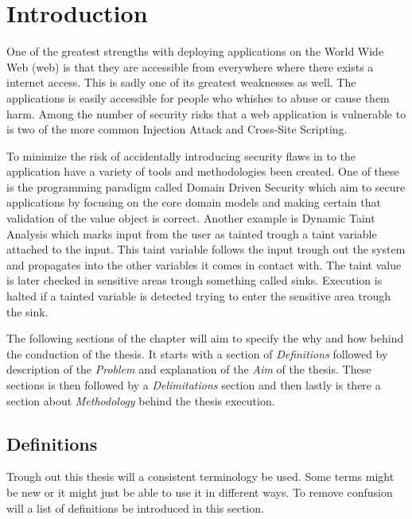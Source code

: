 \chapter{Introduction}
One of the greatest strengths with deploying applications on the World Wide Web (web) is that they are accessible from everywhere where there exists a internet access. This is sadly one of its greatest weaknesses as well. The applications is easily accessible for people who whishes to abuse or cause them harm. Among the number of security risks that a web application is vulnerable to is two of the more common Injection Attack and Cross-Site Scripting. \parencite{OpenWebApplicationSecurityProject, CrossMichael2007Dgtw}

To minimize the risk of accidentally introducing security flaws in to the application have a variety of tools and methodologies been created. One of these is the programming paradigm called Domain Driven Security which aim to secure applications by focusing on the core domain models and making certain that validation of the value object is correct. \parencite{sbd2018, Wilander2009, Johnsson2009} Another example is Dynamic Taint Analysis which marks input from the user as tainted trough a taint variable attached to the input. This taint variable follows the input trough out the system and propagates into the other variables it comes in contact with. The taint value is later checked in sensitive areas trough something called sinks. Execution is halted if a tainted variable is detected trying to enter the sensitive area trough the sink. \parencite{Pan2015, Venkataramani2008}

The following sections of the chapter will aim to specify the why and how behind the conduction of the thesis. It starts with a section of \textit{Definitions} followed by description of the \textit{Problem} and explanation of the \textit{Aim} of the thesis. These sections is then followed by a \textit{Delimitations} section and then lastly is there a section about \textit{Methodology} behind the thesis execution.


\section{Definitions}
Trough out this thesis will a consistent terminology be used. Some terms might be new or it might just be able to use it in different ways. To remove confusion will a list of definitions be introduced in this section.

